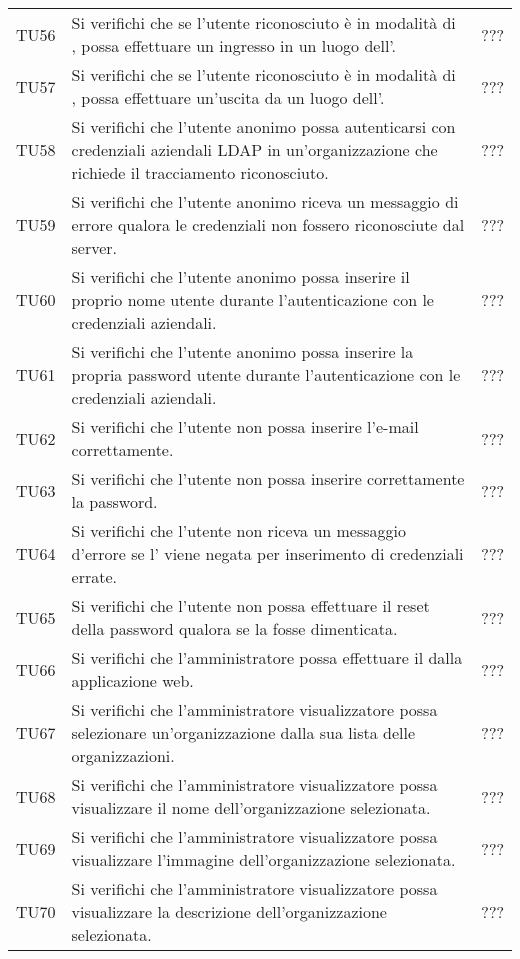 {\begin{longtable}{ c  C{9cm} C{1cm}}
TU56 & Si verifichi che se l'utente riconosciuto è in modalità di , possa effettuare un ingresso in un luogo dell'. & ??? \\
TU57 & Si verifichi che se l'utente riconosciuto è in modalità di , possa effettuare un'uscita da un luogo dell'. & ??? \\
TU58 & Si verifichi che l’utente anonimo possa autenticarsi con credenziali aziendali LDAP in un'organizzazione che richiede il tracciamento riconosciuto. & ??? \\
TU59 & Si verifichi che l’utente anonimo riceva un messaggio di errore qualora le credenziali  non fossero riconosciute dal server. & ??? \\
TU60 & Si verifichi che l’utente anonimo possa inserire il proprio nome utente durante l'autenticazione con le credenziali  aziendali. & ??? \\
TU61 & Si verifichi che l’utente anonimo possa inserire la propria password utente durante l'autenticazione con le credenziali  aziendali. & ??? \\
TU62 & Si verifichi che l’utente non  possa inserire l'e-mail correttamente. & ??? \\
TU63 & Si verifichi che l’utente non  possa inserire correttamente la password. & ??? \\
TU64 & Si verifichi che l’utente non  riceva un messaggio d'errore se l' viene negata per inserimento di credenziali errate. & ??? \\
TU65 & Si verifichi che l’utente non  possa effettuare il reset della password qualora se la fosse dimenticata. & ??? \\
TU66 & Si verifichi che l'amministratore  possa effettuare il  dalla applicazione web. & ??? \\
TU67 & Si verifichi che l’amministratore visualizzatore possa selezionare un’organizzazione dalla sua lista delle organizzazioni. & ??? \\
TU68 & Si verifichi che l'amministratore visualizzatore possa visualizzare il nome dell'organizzazione selezionata. & ??? \\
TU69 & Si verifichi che l'amministratore visualizzatore possa visualizzare l’immagine dell'organizzazione selezionata. & ??? \\
TU70 & Si verifichi che l'amministratore visualizzatore possa visualizzare la descrizione dell'organizzazione selezionata. & ??? \\

\end{longtable}}
